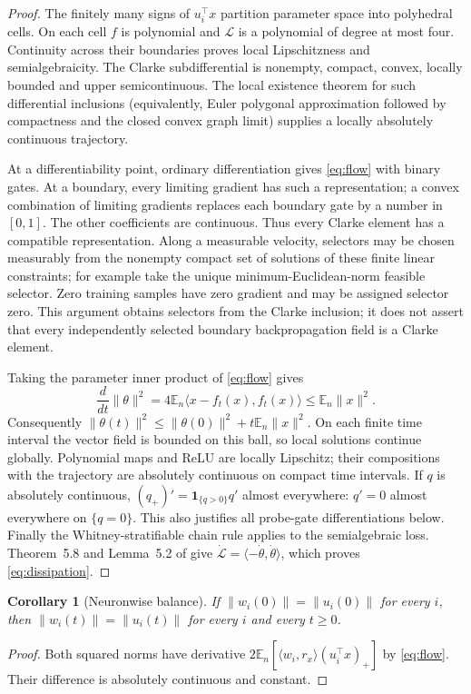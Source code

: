 \documentclass[10pt]{article}
\newtheorem{corollary}[theorem]{Corollary}
\theoremstyle{remark}\newtheorem{remark}[theorem]{Remark}
\begin{document}
\begin{proof}
The finitely many signs of $u_i^\top x$ partition parameter space into
polyhedral cells. On each cell $f$ is polynomial and $\mathcal L$ is a
polynomial of degree at most four. Continuity across their boundaries
proves local Lipschitzness and semialgebraicity. The Clarke subdifferential
is nonempty, compact, convex, locally bounded and upper semicontinuous.
The local existence theorem for such differential inclusions (equivalently,
Euler polygonal approximation followed by compactness and the closed convex
graph limit) supplies a locally absolutely continuous trajectory.

At a differentiability point, ordinary differentiation gives
\eqref{eq:flow} with binary gates. At a boundary, every limiting gradient
has such a representation; a convex combination of limiting gradients
replaces each boundary gate by a number in $[0,1]$. The other coefficients
are continuous. Thus every Clarke element has a compatible representation.
Along a measurable velocity, selectors may be chosen measurably from the
nonempty compact set of solutions of these finite linear constraints;
for example take the unique minimum-Euclidean-norm feasible selector.
Zero training samples have zero gradient and may be assigned selector zero.
This argument obtains selectors from the Clarke inclusion; it does not
assert that every independently selected boundary backpropagation field
is a Clarke element.

Taking the parameter inner product of \eqref{eq:flow} gives
\[
 \frac{d}{dt}\|\theta\|^2
 =4\mathbb E_n\langle x-f_t(x),f_t(x)\rangle
 \le\mathbb E_n\|x\|^2.
\]
Consequently $\|\theta(t)\|^2\le\|\theta(0)\|^2+t\mathbb E_n\|x\|^2$.
On each finite time interval the vector field is bounded on this ball,
so local solutions continue globally. Polynomial maps and ReLU are
locally Lipschitz; their compositions with the trajectory are absolutely
continuous on compact time intervals. If $q$ is absolutely continuous,
$(q_+)'=\mathbf1_{\{q>0\}}q'$ almost everywhere: $q'=0$ almost everywhere
on $\{q=0\}$. This also justifies all probe-gate differentiations below.
Finally the Whitney-stratifiable chain rule applies to the semialgebraic
loss. Theorem~5.8 and Lemma~5.2 of \cite{davis2020} give
$\dot{\mathcal L}=\langle-\dot\theta,\dot\theta\rangle$,
which proves \eqref{eq:dissipation}.
\end{proof}

\begin{corollary}[Neuronwise balance]\label{cor:exact-balance}
If $\|w_i(0)\|=\|u_i(0)\|$ for every $i$, then
$\|w_i(t)\|=\|u_i(t)\|$ for every $i$ and every $t\ge0$.
\end{corollary}
\begin{proof}
Both squared norms have derivative
$2\mathbb E_n[\langle w_i,r_x\rangle(u_i^\top x)_+]$ by
\eqref{eq:flow}. Their difference is absolutely continuous and constant.
\end{proof}
\end{document}
